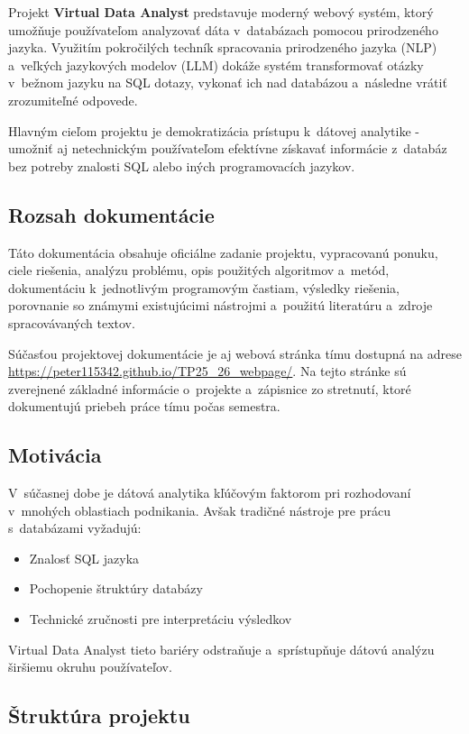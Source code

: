 \documentclass[a4paper, 12pt]{article}
\begin{document}
Projekt \textbf{Virtual Data Analyst} predstavuje moderný webový systém, ktorý umožňuje používateľom analyzovať dáta v~databázach pomocou prirodzeného jazyka. Využitím pokročilých techník spracovania prirodzeného jazyka (NLP) a~veľkých jazykových modelov (LLM) dokáže systém transformovať otázky v~bežnom jazyku na SQL dotazy, vykonať ich nad databázou a~následne vrátiť zrozumiteľné odpovede.

Hlavným cieľom projektu je demokratizácia prístupu k~dátovej analytike - umožniť aj netechnickým používateľom efektívne získavať informácie z~databáz bez potreby znalosti SQL alebo iných programovacích jazykov.

\subsection{Rozsah dokumentácie}

Táto dokumentácia obsahuje oficiálne zadanie projektu, vypracovanú ponuku, ciele riešenia, analýzu problému, opis použitých algoritmov a~metód, dokumentáciu k~jednotlivým programovým častiam, výsledky riešenia, porovnanie so známymi existujúcimi nástrojmi a~použitú literatúru a~zdroje spracovávaných textov.

Súčasťou projektovej dokumentácie je aj webová stránka tímu dostupná na adrese \url{https://peter115342.github.io/TP25_26_webpage/}. Na tejto stránke sú zverejnené základné informácie o~projekte a~zápisnice zo stretnutí, ktoré dokumentujú priebeh práce tímu počas semestra.

\subsection{Motivácia}

V~súčasnej dobe je dátová analytika kľúčovým faktorom pri rozhodovaní v~mnohých oblastiach podnikania. Avšak tradičné nástroje pre prácu s~databázami vyžadujú:
\begin{itemize}
    \item Znalosť SQL jazyka
    \item Pochopenie štruktúry databázy
    \item Technické zručnosti pre interpretáciu výsledkov
\end{itemize}

Virtual Data Analyst tieto bariéry odstraňuje a~sprístupňuje dátovú analýzu širšiemu okruhu používateľov.

\subsection{Štruktúra projektu}
\end{document}
